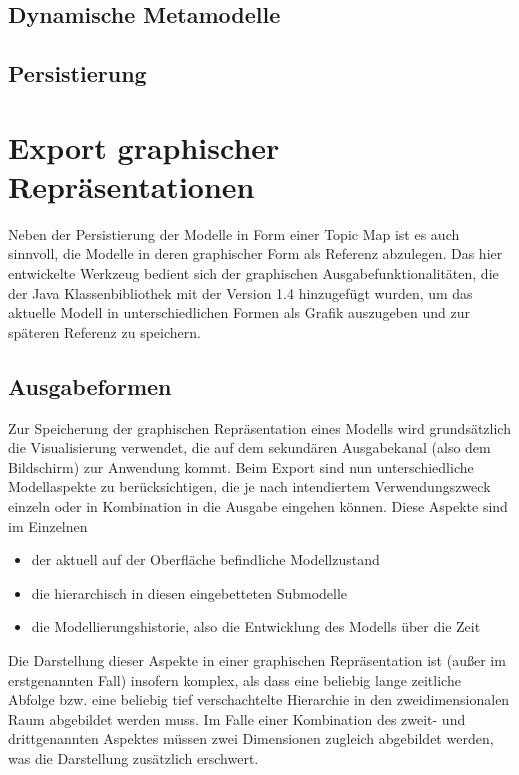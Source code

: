 \subsection{Dynamische Metamodelle}
\label{sec:dynamische_metamodelle}

\subsection{Persistierung}


\section{Export graphischer Repräsentationen} %
\label{sec:export_graphischer_repräsentationen}

Neben der Persistierung der Modelle in Form einer Topic Map ist es auch sinnvoll, die Modelle in deren graphischer Form als Referenz abzulegen. Das hier entwickelte Werkzeug bedient sich der graphischen Ausgabefunktionalitäten, die der Java Klassenbibliothek mit der Version 1.4 hinzugefügt wurden, um das aktuelle Modell in unterschiedlichen Formen als Grafik auszugeben und zur späteren Referenz zu speichern.

\subsection{Ausgabeformen} %
\label{sub:ausgabeformen}

Zur Speicherung der graphischen Repräsentation eines Modells wird grundsätzlich die Visualisierung verwendet, die auf dem sekundären Ausgabekanal (also dem Bildschirm) zur Anwendung kommt. Beim Export sind nun unterschiedliche Modellaspekte zu berücksichtigen, die je nach intendiertem Verwendungszweck einzeln oder in Kombination in die Ausgabe eingehen können. Diese Aspekte sind im Einzelnen
\begin{itemize}
	\item der aktuell auf der Oberfläche befindliche Modellzustand
	\item die hierarchisch in diesen eingebetteten Submodelle
	\item die Modellierungshistorie, also die Entwicklung des Modells über die Zeit
\end{itemize}

Die Darstellung dieser Aspekte in einer graphischen Repräsentation ist (außer im erstgenannten Fall) insofern komplex, als dass eine beliebig lange zeitliche Abfolge bzw. eine beliebig tief verschachtelte Hierarchie in den zweidimensionalen Raum abgebildet werden muss. Im Falle einer Kombination des zweit- und drittgenannten Aspektes müssen zwei Dimensionen zugleich abgebildet werden, was die Darstellung zusätzlich erschwert.

